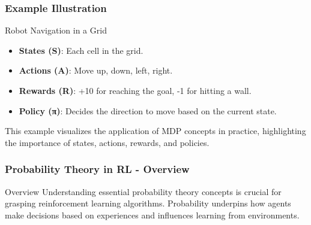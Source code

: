 \documentclass[aspectratio=169]{beamer}
\begin{document}
\begin{frame}[fragile]
    \frametitle{Example Illustration}
    \begin{block}{Robot Navigation in a Grid}
        \begin{itemize}
            \item \textbf{States (S)}: Each cell in the grid.
            \item \textbf{Actions (A)}: Move up, down, left, right.
            \item \textbf{Rewards (R)}: +10 for reaching the goal, -1 for hitting a wall.
            \item \textbf{Policy (π)}: Decides the direction to move based on the current state.
        \end{itemize}
    \end{block}
    This example visualizes the application of MDP concepts in practice, highlighting the importance of states, actions, rewards, and policies.
\end{frame}

\begin{frame}[fragile]
    \frametitle{Probability Theory in RL - Overview}
    \begin{block}{Overview}
        Understanding essential probability theory concepts is crucial for grasping reinforcement learning algorithms. 
        Probability underpins how agents make decisions based on experiences and influences learning from environments.
    \end{block}
\end{frame}
\end{document}
